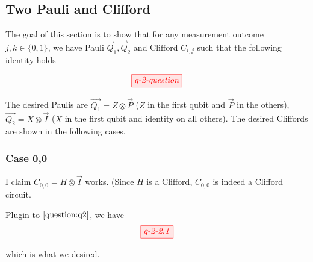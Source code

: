 \subsection{Two Pauli and Clifford}

The goal of this section is to show that for any measurement outcome $j, k \in \{0, 1\}$, we have Pauli $\vec{Q}_1, \vec{Q}_2$ and Clifford $C_{i, j}$ such that the following identity holds 



\begin{equation}\label{question:q2}
	\tikzfig{q-2-question}
\end{equation}

The desired Paulis are $\vec{Q_1} = Z \otimes \vec{P}$ ($Z$ in the first qubit and $\vec{P}$ in the others), $\vec{Q_2} = X \otimes \vec{I}$ ($X$ in the first qubit and identity on all others).
The desired Cliffords are shown in the following cases.

\subsubsection{Case 0,0}
I claim 
$C_{0,0} = H \otimes \vec{I}$ works. (Since $H$ is a Clifford, $C_{0,0}$ is indeed a Clifford circuit.

Plugin to $\eqref{question:q2}$, we have
\begin{align*}
	\tikzfig{q-2-2.1}
\end{align*}
 
which is what we desired.
